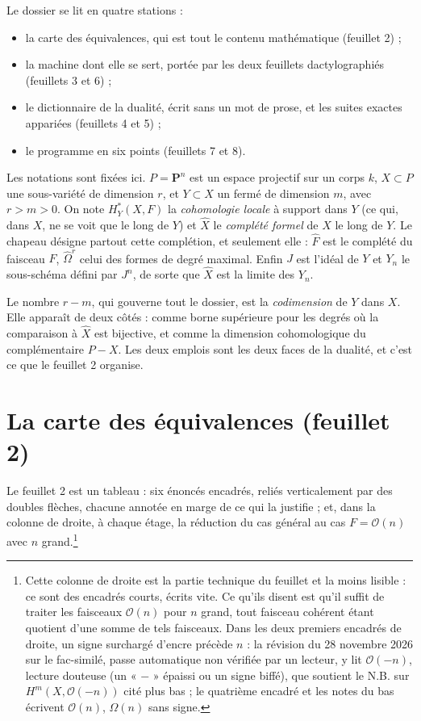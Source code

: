 \documentclass[11pt,a4paper]{article}
\begin{document}
Le dossier se lit en quatre stations :

\begin{itemize}
\item la carte des équivalences, qui est tout le contenu mathématique
  (feuillet 2) ;
\item la machine dont elle se sert, portée par les deux feuillets
  dactylographiés (feuillets 3 et 6) ;
\item le dictionnaire de la dualité, écrit sans un mot de prose, et les suites
  exactes appariées (feuillets 4 et 5) ;
\item le programme en six points (feuillets 7 et 8).
\end{itemize}

Les notations sont fixées ici. $P = \mathbf{P}^{n}$ est un espace projectif sur
un corps $k$, $X \subset P$ une sous-variété de dimension $r$, et
$Y \subset X$ un fermé de dimension $m$, avec $r > m > 0$. On note
$H^{*}_{Y}(X, F)$ la \emph{cohomologie locale} à support dans $Y$ (ce qui,
dans $X$, ne se voit que le long de $Y$) et $\widehat{X}$ le \emph{complété
formel} de $X$ le long de $Y$. Le chapeau désigne partout cette complétion, et
seulement elle : $\widehat{F}$ est le complété du faisceau $F$,
$\widehat{\Omega}^{r}$ celui des formes de degré maximal. Enfin $J$ est
l'idéal de $Y$ et $Y_{n}$ le sous-schéma défini par $J^{n}$, de sorte que
$\widehat{X}$ est la limite des $Y_{n}$.

Le nombre $r - m$, qui gouverne tout le dossier, est la
\emph{codimension} de $Y$ dans $X$. Elle apparaît de deux côtés : comme borne
supérieure pour les degrés où la comparaison à $\widehat{X}$ est bijective, et
comme la dimension cohomologique du complémentaire $P - X$. Les deux emplois
sont les deux faces de la dualité, et c'est ce que le feuillet 2 organise.

\section*{La carte des équivalences (feuillet 2)}

Le feuillet 2 est un tableau : six énoncés encadrés,
reliés verticalement par des doubles flèches, chacune annotée en marge de ce
qui la justifie ; et, dans la colonne de droite, à chaque étage, la réduction
du cas général au cas $F = \mathcal{O}(n)$ avec $n$ grand.\footnote{Cette
colonne de droite est la partie technique du feuillet et la moins lisible : ce
sont des encadrés courts, écrits vite. Ce qu'ils disent est qu'il suffit de
traiter les faisceaux $\mathcal{O}(n)$ pour $n$ grand, tout faisceau cohérent
étant quotient d'une somme de tels faisceaux. Dans les deux premiers
encadrés de droite, un signe surchargé d'encre précède $n$ : la révision du
28 novembre 2026 sur le fac-similé, passe automatique non vérifiée par un
lecteur, y lit $\mathcal{O}(-n)$, lecture douteuse (un « $-$ » épaissi ou un
signe biffé), que soutient le N.B. sur $H^{m}(X, \mathcal{O}(-n))$ cité plus
bas ; le quatrième encadré et les notes du bas écrivent $\mathcal{O}(n)$,
$\Omega(n)$ sans signe.}
\end{document}
